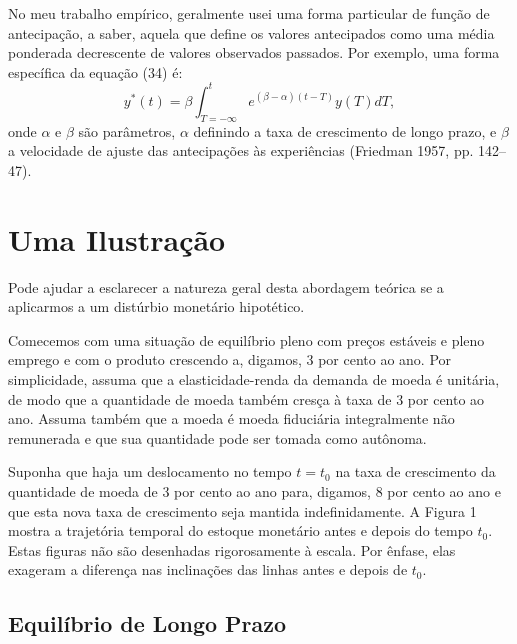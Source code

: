 \documentclass[12pt]{article}
\begin{document}
No meu trabalho empírico, geralmente usei uma forma particular de função de antecipação, a saber, aquela que define os valores antecipados como uma média ponderada decrescente de valores observados passados. Por exemplo, uma forma específica da equação (34) é:
\begin{equation}
y^*(t) = \beta \int_{T=-\infty}^t e^{(\beta - \alpha)(t - T)} y(T) dT,
\end{equation}
onde $\alpha$ e $\beta$ são parâmetros, $\alpha$ definindo a taxa de crescimento de longo prazo, e $\beta$ a velocidade de ajuste das antecipações às experiências (Friedman 1957, pp. 142–47).

\section{Uma Ilustração}

Pode ajudar a esclarecer a natureza geral desta abordagem teórica se a aplicarmos a um distúrbio monetário hipotético.

Comecemos com uma situação de equilíbrio pleno com preços estáveis e pleno emprego e com o produto crescendo a, digamos, 3 por cento ao ano. Por simplicidade, assuma que a elasticidade-renda da demanda de moeda é unitária, de modo que a quantidade de moeda também cresça à taxa de 3 por cento ao ano. Assuma também que a moeda é moeda fiduciária integralmente não remunerada e que sua quantidade pode ser tomada como autônoma.

Suponha que haja um deslocamento no tempo $t = t_0$ na taxa de crescimento da quantidade de moeda de 3 por cento ao ano para, digamos, 8 por cento ao ano e que esta nova taxa de crescimento seja mantida indefinidamente. A Figura 1 mostra a trajetória temporal do estoque monetário antes e depois do tempo $t_0$. Estas figuras não são desenhadas rigorosamente à escala. Por ênfase, elas exageram a diferença nas inclinações das linhas antes e depois de $t_0$.

\subsection{Equilíbrio de Longo Prazo}
\end{document}
